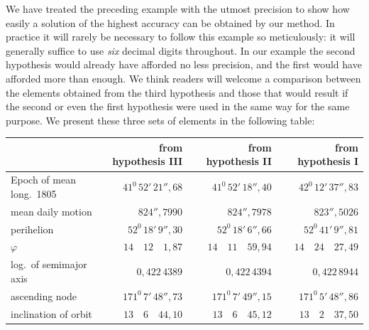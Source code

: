 We have treated the preceding example with the utmost precision to show how easily a solution of the highest accuracy can be obtained by our method. In practice it will rarely be necessary to follow this example so meticulously: it will generally suffice to use \textit{six} decimal digits throughout. In our example the second hypothesis would already have afforded no less precision, and the first would have afforded more than enough. We think readers will welcome a comparison between the elements obtained from the third hypothesis and those that would result if the second or even the first hypothesis were used in the same way for the same purpose. We present these three sets of elements in the following table:
\begin{center}
\begingroup\footnotesize\setlength{\tabcolsep}{2pt}\renewcommand{\arraystretch}{1.2}
\begin{tabular}{|p{1.35in}|r|r|r|}\hline
& from hypothesis III & from hypothesis II & from hypothesis I\\\hline
{\raggedright Epoch of mean long.\ 1805\par} & $41^{0}\,52'\,21''{,}68$ & $41^{0}\,52'\,18''{,}40$ & $42^{0}\,12'\,37''{,}83$\\
mean daily motion & $824''{,}7990$ & $824''{,}7978$ & $823''{,}5026$\\
perihelion & $52^{0}\,18'\,9''{,}30$ & $52^{0}\,18'\,6''{,}66$ & $52^{0}\,41'\,9''{,}81$\\
$\varphi$ & $14\quad12\quad1{,}87$ & $14\quad11\quad59{,}94$ & $14\quad24\quad27{,}49$\\
log.\ of semimajor axis & $0{,}422\,4389$ & $0{,}422\,4394$ & $0{,}422\,8944$\\
ascending node & $171^{0}\,7'\,48''{,}73$ & $171^{0}\,7'\,49''{,}15$ & $171^{0}\,5'\,48''{,}86$\\
inclination of orbit & $13\quad6\quad44{,}10$ & $13\quad6\quad45{,}12$ & $13\quad2\quad37{,}50$\\\hline
\end{tabular}\endgroup
\end{center}

